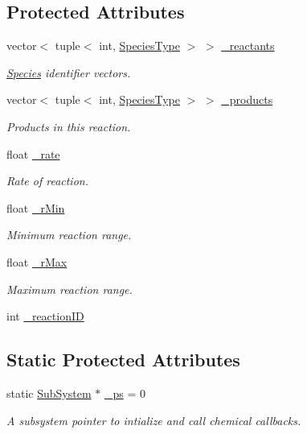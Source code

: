 \subsection*{Protected Attributes}
\begin{DoxyCompactItemize}
\item 
vector$<$ tuple$<$ int, \hyperlink{Species_8h_a50651af47c56ea0e27235468d23542cf}{Species\+Type} $>$ $>$ \hyperlink{classCrossFilamentRxnManager_ad1c41fba7b85d5eedee363b8eeb472d4}{\+\_\+reactants}
\begin{DoxyCompactList}\small\item\em \hyperlink{classSpecies}{Species} identifier vectors. \end{DoxyCompactList}\item 
vector$<$ tuple$<$ int, \hyperlink{Species_8h_a50651af47c56ea0e27235468d23542cf}{Species\+Type} $>$ $>$ \hyperlink{classCrossFilamentRxnManager_a935b5ee4f96177021901e55ab213665e}{\+\_\+products}
\begin{DoxyCompactList}\small\item\em Products in this reaction. \end{DoxyCompactList}\item 
float \hyperlink{classCrossFilamentRxnManager_a653389d857c83927af4e621963af3ab1}{\+\_\+rate}
\begin{DoxyCompactList}\small\item\em Rate of reaction. \end{DoxyCompactList}\item 
float \hyperlink{classCrossFilamentRxnManager_a0822316b3a9bea17ceecc12231ae8eee}{\+\_\+r\+Min}
\begin{DoxyCompactList}\small\item\em Minimum reaction range. \end{DoxyCompactList}\item 
float \hyperlink{classCrossFilamentRxnManager_a8027479055b5bc902c2f3eab39fc6d50}{\+\_\+r\+Max}
\begin{DoxyCompactList}\small\item\em Maximum reaction range. \end{DoxyCompactList}\item 
int \hyperlink{classCrossFilamentRxnManager_a97369fa2db6318dd7b60c3772087b4e1}{\+\_\+reaction\+I\+D}
\end{DoxyCompactItemize}
\subsection*{Static Protected Attributes}
\begin{DoxyCompactItemize}
\item 
static \hyperlink{classSubSystem}{Sub\+System} $\ast$ \hyperlink{classCrossFilamentRxnManager_ae13a9fd2fddc2cf5e21df314aba43fdf}{\+\_\+ps} = 0
\begin{DoxyCompactList}\small\item\em A subsystem pointer to intialize and call chemical callbacks. \end{DoxyCompactList}\end{DoxyCompactItemize}
